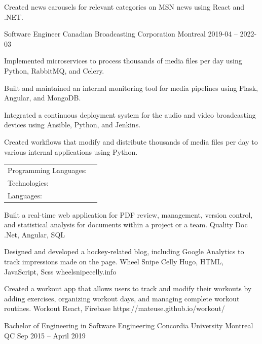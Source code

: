 \documentclass[]{awesome-cv}
\begin{document}
\begin{cventries}
{\begin{cvitems}
		\item {Created news carousels for relevant categories on MSN news using React and .NET.}
		\end{cvitems}}
	\cventry
	{Software Engineer}
	{Canadian Broadcasting Corporation}
	{Montreal}
	{2019-04 – 2022-03}
	{\begin{cvitems}
		\item {Implemented microservices to process thousands of media files per day using Python, RabbitMQ, and Celery.}
		\item {Built and maintained an internal monitoring tool for media pipelines using Flask, Angular, and MongoDB.}
		\item {Integrated a continuous deployment system for the audio and video broadcasting devices using Ansible, Python, and Jenkins.}
		\item {Created workflows that modify and distribute thousands of media files per day to various internal applications using Python.}
		\end{cvitems}}
\end{cventries}
\begin{cventries}
	\cventry
	{}
	{\def\arraystretch{1.15}{\begin{tabular}{ l l }
		Programming Languages:  & {\skill{ Python, .NET, React, Angular, Node, Java, Golang, HTML, CSS}} \\
		Technologies:  & {\skill{ Ansible, Jenkins, MongoDB, SQL, Rabbit MQ, Celery, AWS, Kusto}} \\
		Languages:  & {\skill{ English (Mother Tongue), French (Fluent)}} \\
		\end{tabular}}}
	{}
	{}
	{}
\end{cventries}

\vspace{-7mm}
\begin{cventries}
	\cventry
	{Built a real-time web application for PDF review, management, version control, and statistical analysis for documents within a project or a team.}
	{Quality Doc}
	{.Net, Angular, SQL}
	{}
	{}
	
	\vspace{-5mm}
	\cventry
	{Designed and developed a hockey-related blog, including Google Analytics to track impressions made on the page.}
	{Wheel Snipe Celly}
	{Hugo, HTML, JavaScript, Scss}
	{wheelsnipecelly.info}
	{}
	
	\vspace{-5mm}
	\cventry
	{Created a workout app that allows users to track and modify their workouts by adding exercises, organizing workout days, and managing complete workout routines.}
	{Workout}
	{React, Firebase}
	{https://mateuse.github.io/workout/}
	{}
	
	\vspace{-5mm}
\end{cventries}

\begin{cventries}
	\cventry
	{Bachelor of Engineering in Software Engineering}
	{Concordia University}
	{Montreal QC}
	{Sep 2015 – April 2019}
	{}
\end{cventries}

\vspace{-2mm}
\ 
\end{document}

